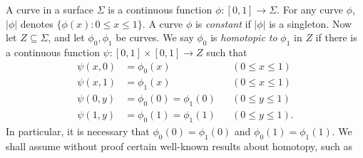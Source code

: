 A curve in a surface $\Sigma$ is a continuous function $\phi : [0, 1] \to \Sigma$. For any curve $\phi$, $|\phi|$ denotes $\{\phi(x) : 0 \le x \le 1\}$. A curve $\phi$ is \textit{constant} if $|\phi|$ is a singleton. Now let $Z \subseteq \Sigma$, and let $\phi_0, \phi_1$ be curves. We say $\phi_0$ is \textit{homotopic to} $\phi_1$ in $Z$ if there is a continuous function $\psi : [0, 1] \times [0, 1] \to Z$ such that
\begin{align*}
\psi(x, 0) &= \phi_0(x) && (0 \le x \le 1) \\
\psi(x, 1) &= \phi_1(x) && (0 \le x \le 1) \\
\psi(0, y) &= \phi_0(0) = \phi_1(0) && (0 \le y \le 1) \\
\psi(1, y) &= \phi_0(1) = \phi_1(1) && (0 \le y \le 1).
\end{align*}
In particular, it is necessary that $\phi_0(0) = \phi_1(0)$ and $\phi_0(1) = \phi_1(1)$. We shall assume without proof certain well-known results about homotopy, such as
